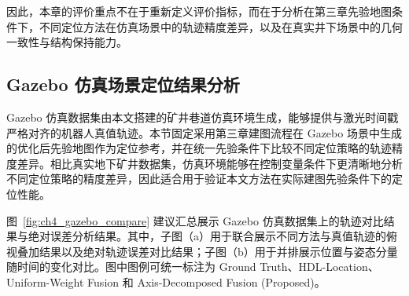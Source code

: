因此，本章的评价重点不在于重新定义评价指标，而在于分析在第三章先验地图条件下，不同定位方法在仿真场景中的轨迹精度差异，以及在真实井下场景中的几何一致性与结构保持能力。

\subsection{Gazebo 仿真场景定位结果分析}

Gazebo 仿真数据集由本文搭建的矿井巷道仿真环境生成，能够提供与激光时间戳严格对齐的机器人真值轨迹。本节固定采用第三章建图流程在 Gazebo 场景中生成的优化后先验地图作为定位参考，并在统一先验条件下比较不同定位策略的轨迹精度差异。相比真实地下矿井数据集，仿真环境能够在控制变量条件下更清晰地分析不同定位策略的精度差异，因此适合用于验证本文方法在实际建图先验条件下的定位性能。

图~\ref{fig:ch4_gazebo_compare} 建议汇总展示 Gazebo 仿真数据集上的轨迹对比结果与绝对误差分析结果。其中，子图（a）用于联合展示不同方法与真值轨迹的俯视叠加结果以及绝对轨迹误差对比结果；子图（b）用于并排展示位置与姿态分量随时间的变化对比。图中图例可统一标注为 Ground Truth、HDL-Location、Uniform-Weight Fusion 和 Axis-Decomposed Fusion (Proposed)。

